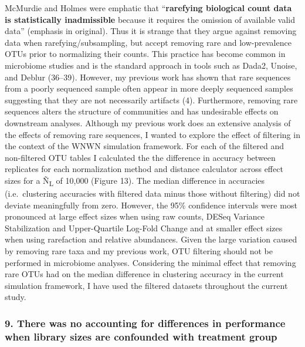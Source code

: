\documentclass[
]{article}
\begin{document}
McMurdie and Holmes were emphatic that ``\textbf{rarefying biological
count data is statistically inadmissible} because it requires the
omission of available valid data'' (emphasis in original). Thus it is
strange that they argue against removing data when
rarefying/subsampling, but accept removing rare and low-prevalence OTUs
prior to normalizing their counts. This practice has become common in
microbiome studies and is the standard approach in tools such as Dada2,
Unoise, and Deblur (36--39). However, my previous work has shown that
rare sequences from a poorly sequenced sample often appear in more
deeply sequenced samples suggesting that they are not necessarily
artifacts (4). Furthermore, removing rare sequences alters the structure
of communities and has undesirable effects on downstream analyses.
Although my previous work does an extensive analysis of the effects of
removing rare sequences, I wanted to explore the effect of filtering in
the context of the WNWN simulation framework. For each of the filtered
and non-filtered OTU tables I calculated the the difference in accuracy
between replicates for each normalization method and distance calculator
across effect sizes for a Ñ\textsubscript{L} of 10,000 (Figure 13). The
median difference in accuracies (i.e.~clustering accuracies with
filtered data minus those without filtering) did not deviate
meaningfully from zero. However, the 95\% confidence intervals were most
pronounced at large effect sizes when using raw counts, DESeq Variance
Stabilization and Upper-Quartile Log-Fold Change and at smaller effect
sizes when using rarefaction and relative abundances. Given the large
variation caused by removing rare taxa and my previous work, OTU
filtering should not be performed in microbiome analyses. Considering
the minimal effect that removing rare OTUs had on the median difference
in clustering accuracy in the current simulation framework, I have used
the filtered datasets throughout the current study.

\hypertarget{there-was-no-accounting-for-differences-in-performance-when-library-sizes-are-confounded-with-treatment-group}{%
\subsubsection{9. There was no accounting for differences in performance
when library sizes are confounded with treatment
group}\label{there-was-no-accounting-for-differences-in-performance-when-library-sizes-are-confounded-with-treatment-group}}
\end{document}
